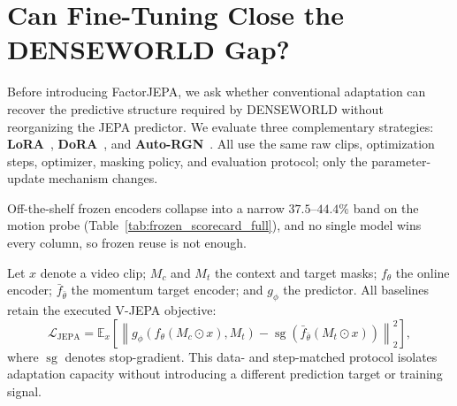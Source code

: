 





\section{Can Fine-Tuning Close the \textbf{DENSEWORLD} Gap?}
\label{sec:vjepa_adaptation_baselines}

Before introducing FactorJEPA, we ask whether conventional adaptation can recover the predictive structure required by DENSEWORLD without reorganizing the JEPA predictor. We evaluate three complementary strategies: \textbf{LoRA}~\cite{hu2022lora}, \textbf{DoRA}~\cite{liu2024dora}, and \textbf{Auto-RGN}~\cite{lee2023surgical}. All use the same raw clips, optimization steps, optimizer, masking policy, and evaluation protocol; only the parameter-update mechanism changes.


\noindent Off-the-shelf frozen encoders collapse into a narrow $37.5$--$44.4\%$ band on the motion probe (Table~\ref{tab:frozen_scorecard_full}), and no single model wins every column, so frozen reuse is not enough.

Let $x$ denote a video clip; $M_c$ and $M_t$ the context and target masks; $f_\theta$ the online encoder; $\bar f_{\bar\theta}$ the momentum target encoder; and $g_\phi$ the predictor. All baselines retain the executed V-JEPA objective:
\[
\mathcal{L}_{\mathrm{JEPA}}
=
\mathbb{E}_{x}
\left[
\left\|
g_\phi\!\left(f_\theta(M_c\odot x),M_t\right)
-
\operatorname{sg}\!\left(
\bar f_{\bar\theta}(M_t\odot x)
\right)
\right\|_2^2
\right],
\]
where $\operatorname{sg}$ denotes stop-gradient. This data- and step-matched protocol isolates adaptation capacity without introducing a different prediction target or training signal.

